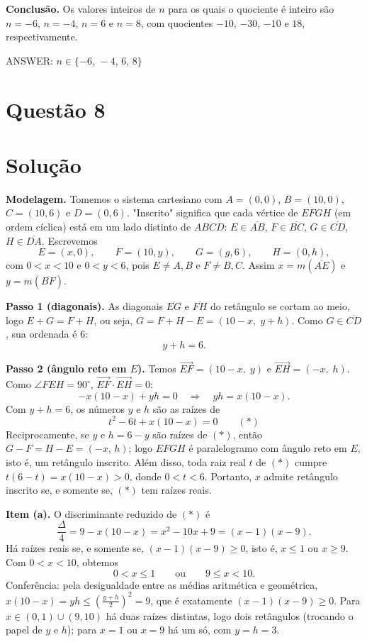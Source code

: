 \documentclass{article}%
\begin{document}
\textbf{Conclusão.} Os valores inteiros de $n$ para os quais o quociente é inteiro são $n=-6$, $n=-4$, $n=6$ e $n=8$, com quocientes $-10$, $-30$, $-10$ e $18$, respectivamente.

ANSWER: $n \in \{-6,\,-4,\,6,\,8\}$%
\newpage%
\section*{Questão 8}

\section*{Solução}

\textbf{Modelagem.} Tomemos o sistema cartesiano com $A=(0,0)$, $B=(10,0)$, $C=(10,6)$ e $D=(0,6)$. "Inscrito" significa que cada vértice de $EFGH$ (em ordem cíclica) está em um lado distinto de $ABCD$: $E\in\overline{AB}$, $F\in\overline{BC}$, $G\in\overline{CD}$, $H\in\overline{DA}$. Escrevemos
\[
E=(x,0),\qquad F=(10,y),\qquad G=(g,6),\qquad H=(0,h),
\]
com $0<x<10$ e $0<y<6$, pois $E\neq A,B$ e $F\neq B,C$. Assim $x=m(\overline{AE})$ e $y=m(\overline{BF})$.

\textbf{Passo 1 (diagonais).} As diagonais $\overline{EG}$ e $\overline{FH}$ do retângulo se cortam ao meio, logo $E+G=F+H$, ou seja, $G=F+H-E=(10-x,\;y+h)$. Como $G\in\overline{CD}$, sua ordenada é $6$:
\[
y+h=6 .
\]

\textbf{Passo 2 (ângulo reto em $E$).} Temos $\vec{EF}=(10-x,\;y)$ e $\vec{EH}=(-x,\;h)$. Como $\angle FEH=90^\circ$, $\vec{EF}\cdot\vec{EH}=0$:
\[
-x(10-x)+yh=0 \quad\Longrightarrow\quad yh=x(10-x).
\]
Com $y+h=6$, os números $y$ e $h$ são as raízes de
\[
t^2-6t+x(10-x)=0 \qquad (*)
\]
Reciprocamente, se $y$ e $h=6-y$ são raízes de $(*)$, então $G-F=H-E=(-x,\,h)$; logo $EFGH$ é paralelogramo com ângulo reto em $E$, isto é, um retângulo inscrito. Além disso, toda raiz real $t$ de $(*)$ cumpre $t(6-t)=x(10-x)>0$, donde $0<t<6$. Portanto, $x$ admite retângulo inscrito se, e somente se, $(*)$ tem raízes reais.

\textbf{Item (a).} O discriminante reduzido de $(*)$ é
\[
\frac{\Delta}{4}=9-x(10-x)=x^2-10x+9=(x-1)(x-9).
\]
Há raízes reais se, e somente se, $(x-1)(x-9)\ge 0$, isto é, $x\le 1$ ou $x\ge 9$. Com $0<x<10$, obtemos
\[
0<x\le 1 \qquad\text{ou}\qquad 9\le x<10 .
\]
Conferência: pela desigualdade entre as médias aritmética e geométrica, $x(10-x)=yh\le\left(\frac{y+h}{2}\right)^2=9$, que é exatamente $(x-1)(x-9)\ge 0$. Para $x\in(0,1)\cup(9,10)$ há duas raízes distintas, logo dois retângulos (trocando o papel de $y$ e $h$); para $x=1$ ou $x=9$ há um só, com $y=h=3$.
\end{document}
